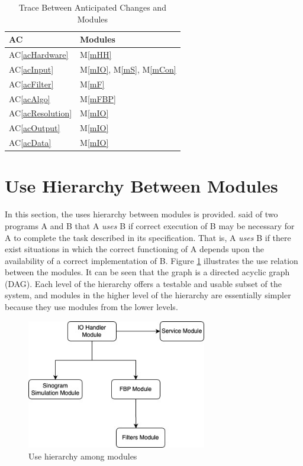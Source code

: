 \documentclass[12pt, titlepage]{article}
\newcommand{\acref}[1]{AC\ref{#1}}
\newcommand{\mref}[1]{M\ref{#1}}
\begin{document}
\begin{table}[H]
\centering
\begin{tabular}{p{} p{}}
\toprule
\textbf{AC} & \textbf{Modules}\\
\midrule
\acref{acHardware} & \mref{mHH}\\
\acref{acInput} & \mref{mIO}, \mref{mS}, \mref{mCon}\\
\acref{acFilter} & \mref{mF}\\
\acref{acAlgo} & \mref{mFBP}\\
\acref{acResolution} & \mref{mIO}\\
\acref{acOutput} & \mref{mIO}\\
\acref{acData} & \mref{mIO}\\
\bottomrule
\end{tabular}
\caption{Trace Between Anticipated Changes and Modules}
\label{TblACT}
\end{table}

\section{Use Hierarchy Between Modules} \label{SecUse}

In this section, the uses hierarchy between modules is
provided. \citet{Parnas1978} said of two programs A and B that A {\em uses} B if
correct execution of B may be necessary for A to complete the task described in
its specification. That is, A {\em uses} B if there exist situations in which
the correct functioning of A depends upon the availability of a correct
implementation of B.  Figure \ref{FigUH} illustrates the use relation between
the modules. It can be seen that the graph is a directed acyclic graph
(DAG). Each level of the hierarchy offers a testable and usable subset of the
system, and modules in the higher level of the hierarchy are essentially simpler
because they use modules from the lower levels.

\begin{figure}[H]
\centering
\includegraphics[width=0.7\textwidth]{DAG.jpg}
\caption{Use hierarchy among modules}
\label{FigUH}
\end{figure}
\end{document}

